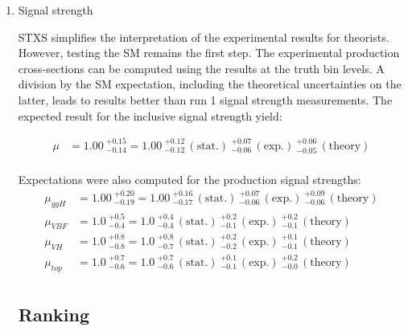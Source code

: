 \begin{enumerate}

\item Signal strength
\label{sec:orgc349fef}

STXS simplifies the interpretation of the experimental results for theorists.
However, testing the SM remains the first step.
The experimental production cross-sections can be computed using the results at the truth bin levels.
A division by the SM expectation, including the theoretical uncertainties on the latter, leads to results better than run 1 signal strength measurements.
The expected result for the inclusive signal strength yield:

\begin{align*}
\mu &= 1.00\ ^{+0.15}_{-0.14} = 1.00\ ^{+0.12}_{-0.12}\,\mathrm{(stat.)}\ ^{+0.07}_{-0.06}\,\mathrm{(exp.)}\ ^{+0.06}_{-0.05}\,\mathrm{(theory)}\\
\end{align*}

Expectations were also computed for the production signal strengths:
\begin{align*}
  \label{muResult}
\mu_{ggH} &= 1.00\ ^{+0.20}_{-0.19} = 1.00\ ^{+0.16}_{-0.17}\,\mathrm{(stat.)}\ ^{+0.07}_{-0.06}\,\mathrm{(exp.)}\ ^{+0.09}_{-0.06}\,\mathrm{(theory)}\\
\mu_{VBF} &= 1.0\ ^{+0.5}_{-0.4} = 1.0\ ^{+0.4}_{-0.4}\,\mathrm{(stat.)}\ ^{+0.2}_{-0.1}\,\mathrm{(exp.)}\ ^{+0.2}_{-0.1}\,\mathrm{(theory)}\\
\mu_{VH} &= 1.0\ ^{+0.8}_{-0.8} = 1.0\ ^{+0.8}_{-0.7}\,\mathrm{(stat.)}\ ^{+0.2}_{-0.2}\,\mathrm{(exp.)}\ ^{+0.1}_{-0.1}\,\mathrm{(theory)}\\
\mu_{top} &= 1.0\ ^{+0.7}_{-0.6} = 1.0\ ^{+0.7}_{-0.6}\,\mathrm{(stat.)}\ ^{+0.1}_{-0.1}\,\mathrm{(exp.)}\ ^{+0.2}_{-0.0}\,\mathrm{(theory)}\\
\end{align*}


\subsection{Ranking}
\label{sec:orge5a0462}


\end{enumerate}
